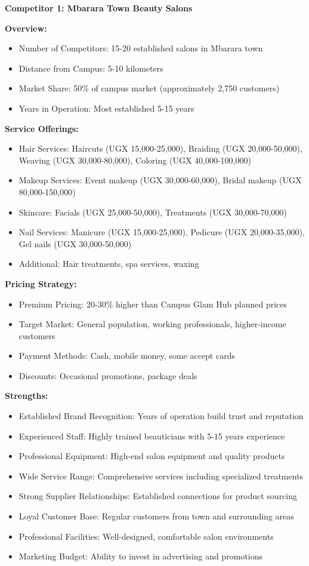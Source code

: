 \documentclass[a4paper,12pt]{article}
\begin{document}
\textbf{Competitor 1: Mbarara Town Beauty Salons}

\textbf{Overview:}
\begin{itemize}[leftmargin=2em]
    \item Number of Competitors: 15-20 established salons in Mbarara town
    \item Distance from Campus: 5-10 kilometers
    \item Market Share: 50\% of campus market (approximately 2,750 customers)
    \item Years in Operation: Most established 5-15 years
\end{itemize}

\textbf{Service Offerings:}
\begin{itemize}[leftmargin=2em]
    \item Hair Services: Haircuts (UGX 15,000-25,000), Braiding (UGX 20,000-50,000), Weaving (UGX 30,000-80,000), Coloring (UGX 40,000-100,000)
    \item Makeup Services: Event makeup (UGX 30,000-60,000), Bridal makeup (UGX 80,000-150,000)
    \item Skincare: Facials (UGX 25,000-50,000), Treatments (UGX 30,000-70,000)
    \item Nail Services: Manicure (UGX 15,000-25,000), Pedicure (UGX 20,000-35,000), Gel nails (UGX 30,000-50,000)
    \item Additional: Hair treatments, spa services, waxing
\end{itemize}

\textbf{Pricing Strategy:}
\begin{itemize}[leftmargin=2em]
    \item Premium Pricing: 20-30\% higher than Campus Glam Hub planned prices
    \item Target Market: General population, working professionals, higher-income customers
    \item Payment Methods: Cash, mobile money, some accept cards
    \item Discounts: Occasional promotions, package deals
\end{itemize}

\textbf{Strengths:}
\begin{itemize}[leftmargin=2em]
    \item Established Brand Recognition: Years of operation build trust and reputation
    \item Experienced Staff: Highly trained beauticians with 5-15 years experience
    \item Professional Equipment: High-end salon equipment and quality products
    \item Wide Service Range: Comprehensive services including specialized treatments
    \item Strong Supplier Relationships: Established connections for product sourcing
    \item Loyal Customer Base: Regular customers from town and surrounding areas
    \item Professional Facilities: Well-designed, comfortable salon environments
    \item Marketing Budget: Ability to invest in advertising and promotions
\end{itemize}
\end{document}
